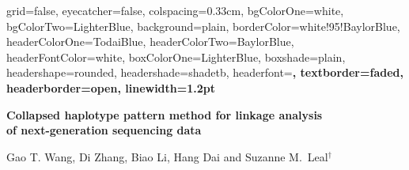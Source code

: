 \documentclass[ansiepaper, portrait, fontscale=0.35]{baposter} %
\begin{document}


\begin{poster} {
    grid=false,
    eyecatcher=false, 
    colspacing=0.33cm,               %
    bgColorOne=white,                %
    bgColorTwo=LighterBlue,          %
    background=plain,
    borderColor=white!95!BaylorBlue,
    headerColorOne=TodaiBlue,        %
    headerColorTwo=BaylorBlue,       %
    headerFontColor=white,
    boxColorOne=LighterBlue,
    boxshade=plain,
    headershape=rounded,
    headershade=shadetb,
    headerfont=\Large \bf,
    textborder=faded,
    headerborder=open,
    linewidth=1.2pt
}

    {\sf \Huge
    \vspace{0.6cm}
    \textbf{Collapsed haplotype pattern method for linkage analysis \\ of next-generation sequencing data}
    }
    {
    \begin{minipage}{24.5cm}
      \vspace{0.5cm}
      \sf
      Gao T. Wang, Di Zhang, Biao Li, Hang Dai and Suzanne M.~Leal$^\dagger$ \\


\end{minipage}}
\end{poster}
\end{document}
